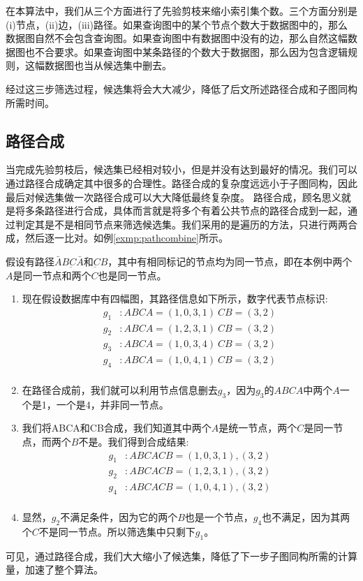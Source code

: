 \documentclass{XDBAthesis}
\numberwithin{algorithm}{chapter}
\begin{document}
    在本算法中，我们从三个方面进行了先验剪枝来缩小索引集个数。三个方面分别是(i)节点，(ii)边，(iii)路径。如果查询图中的某个节点个数大于数据图中的，那么数据图自然不会包含查询图。如果查询图中有数据图中没有的边，那么自然这幅数据图也不合要求。如果查询图中某条路径的个数大于数据图，那么因为包含逻辑规则，这幅数据图也当从候选集中删去。
    
    经过这三步筛选过程，候选集将会大大减少，降低了后文所述路径合成和子图同构所需时间。
\subsection{路径合成}
当完成先验剪枝后，候选集已经相对较小，但是并没有达到最好的情况。我们可以通过路径合成确定其中很多的合理性。路径合成的复杂度远远小于子图同构，因此最后对候选集做一次路径合成可以大大降低最终复杂度。
路径合成，顾名思义就是将多条路径进行合成，具体而言就是将多个有着公共节点的路径合成到一起，通过判定其是不是相同节点来筛选候选集。我们采用的是遍历的方法，只进行两两合成，然后逐一比对。如例\ref{exmp:pathcombine}所示。
\begin{exmp}
    假设有路径$\bar{A}B\underbar{C}\bar{A} $和$\underbar{C}B$，其中有相同标记的节点均为同一节点，即在本例中两个$A$是同一节点和两个$C$也是同一节点。
    \label{exmp:pathcombine}
    \begin{enumerate}
        \item 现在假设数据库中有四幅图，其路径信息如下所示，数字代表节点标识:
        $$
        \begin{aligned}
            g_1 &:ABCA={(1,0,3,1)}\ CB={(3,2)}\\
            g_2 &:ABCA={(1,2,3,1)}\ CB={(3,2)}\\
            g_3 &:ABCA={(1,0,3,4)}\ CB={(3,2)}\\
            g_4 &:ABCA={(1,0,4,1)}\ CB={(3,2)}\\
        \end{aligned}
        $$
        \item 在路径合成前，我们就可以利用节点信息删去$g_3$，因为$g_3$的$ABCA$中两个$A$一个是1，一个是4，并非同一节点。
        \item 我们将ABCA和CB合成，我们知道其中两个$A$是统一节点，两个$C$是同一节点，而两个$B$不是。我们得到合成结果:
        $$
        \begin{aligned}
            g_1 &:ABCACB={(1,0,3,1),(3,2)}\\
            g_2 &:ABCACB={(1,2,3,1),(3,2)}\\
            g_4 &:ABCACB={(1,0,4,1),(3,2)}\\
        \end{aligned}
        $$
        \item  显然，$g_2$不满足条件，因为它的两个$B$也是一个节点，$g_4$也不满足，因为其两个$C$不是同一节点。所以筛选集中只剩下$g_1$。
    \end{enumerate}    
\end{exmp}
可见，通过路径合成，我们大大缩小了候选集，降低了下一步子图同构所需的计算量，加速了整个算法。
\end{document}
